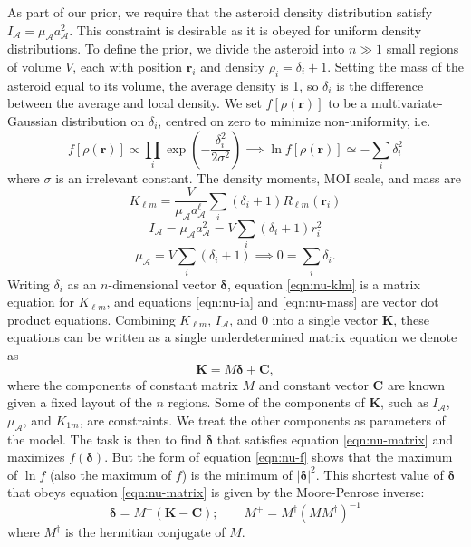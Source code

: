\documentclass[9pt,twocolumn]{article}
\newcommand{\parens}[1]{\left( #1 \right)}
\numberwithin{equation}{section}
\begin{document}
As part of our prior, we require that the asteroid density distribution satisfy $I_\mathcal{A} = \mu_\mathcal{A} a_\mathcal{A}^2$. This constraint is desirable as it is obeyed for uniform density distributions. To define the prior, we divide the asteroid into $n \gg 1$ small regions of volume $V$, each with position $\bm r_i$ and density $\rho_i = \delta_i + 1$. Setting the mass of the asteroid equal to its volume, the average density is 1, so $\delta_i$ is the difference between the average and local density. We set $f[\rho(\bm r)]$ to be a multivariate-Gaussian distribution on $\delta_i$, centred on zero to minimize non-uniformity, i.e.
\begin{equation}
  f[\rho(\bm r)] \propto \prod_i \exp\parens{-\frac{\delta_i^2}{2\sigma^2}} \implies \ln f[\rho(\bm r)] \simeq -\sum_i \delta_i^2
  \label{eqn:nu-f}
\end{equation}
where $\sigma$ is an irrelevant constant. The density moments, MOI scale, and mass are 
\begin{equation}
  K_{\ell m} = \frac{V}{\mu_\mathcal{A}a_\mathcal{A}^{\ell}} \sum_i (\delta_i + 1) R_{\ell m}(\bm r_i)
  \label{eqn:nu-klm}
\end{equation}
\begin{equation}
  I_\mathcal{A} = \mu_\mathcal{A} a_\mathcal{A}^2 = V \sum_i (\delta_i + 1) r_i^2
  \label{eqn:nu-ia}
\end{equation}
\begin{equation}
  \mu_\mathcal{A} = V\sum_i (\delta_i + 1) \implies 0 = \sum_i \delta_i.
  \label{eqn:nu-mass}
\end{equation}
Writing $\delta_i$ as an $n$-dimensional vector $\bm \delta$, equation \ref{eqn:nu-klm} is a matrix equation for $K_{\ell m}$, and equations \ref{eqn:nu-ia} and \ref{eqn:nu-mass} are vector dot product equations. Combining $K_{\ell m}$, $I_\mathcal{A}$, and $0$ into a single vector $\bm K$, these equations can be written as a single underdetermined matrix equation we denote as 
\begin{equation}
  \bm K = M \bm \delta + \bm C,
  \label{eqn:nu-matrix}
\end{equation}
where the components of constant matrix $M$ and constant vector $\bm C$ are known given a fixed layout of the $n$ regions. Some of the components of $\bm K$, such as $I_\mathcal{A}$, $\mu_\mathcal{A}$, and $K_{1m}$, are constraints. We treat the other components as parameters of the model. The task is then to find $\bm \delta$ that satisfies equation \ref{eqn:nu-matrix} and maximizes $f(\bm \delta)$. But the form of equation \ref{eqn:nu-f} shows that the maximum of $\ln f$ (also the maximum of $f$) is the minimum of $|\bm \delta|^2$. This shortest value of $\bm \delta$ that obeys equation \ref{eqn:nu-matrix} is given by the Moore-Penrose inverse:
\begin{equation}
  \bm \delta = M^+ (\bm K - \bm C); \qquad M^+ = M^\dagger(M M^\dagger)^{-1}
  \label{eqn:nu-delta}
\end{equation}
where $M^\dagger$ is the hermitian conjugate of $M$.
\end{document}
